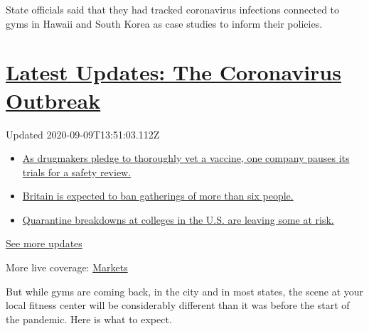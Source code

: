 State officials said that they had tracked coronavirus infections
connected to gyms in Hawaii and South Korea as case studies to inform
their policies.

\hypertarget{latest-updates-the-coronavirus-outbreak}{%
\section{\texorpdfstring{\href{https://www.nytimes3xbfgragh.onion/2020/09/09/world/covid-19-coronavirus.html?action=click\&pgtype=Article\&state=default\&region=MAIN_CONTENT_1\&context=storylines_live_updates}{Latest
Updates: The Coronavirus
Outbreak}}{Latest Updates: The Coronavirus Outbreak}}\label{latest-updates-the-coronavirus-outbreak}}

Updated 2020-09-09T13:51:03.112Z

\begin{itemize}
\tightlist
\item
  \href{https://www.nytimes3xbfgragh.onion/2020/09/09/world/covid-19-coronavirus.html?action=click\&pgtype=Article\&state=default\&region=MAIN_CONTENT_1\&context=storylines_live_updates\#link-70cea8bb}{As
  drugmakers pledge to thoroughly vet a vaccine, one company pauses its
  trials for a safety review.}
\item
  \href{https://www.nytimes3xbfgragh.onion/2020/09/09/world/covid-19-coronavirus.html?action=click\&pgtype=Article\&state=default\&region=MAIN_CONTENT_1\&context=storylines_live_updates\#link-780eaa2f}{Britain
  is expected to ban gatherings of more than six people.}
\item
  \href{https://www.nytimes3xbfgragh.onion/2020/09/09/world/covid-19-coronavirus.html?action=click\&pgtype=Article\&state=default\&region=MAIN_CONTENT_1\&context=storylines_live_updates\#link-11cec4c0}{Quarantine
  breakdowns at colleges in the U.S. are leaving some at risk.}
\end{itemize}

\href{https://www.nytimes3xbfgragh.onion/2020/09/09/world/covid-19-coronavirus.html?action=click\&pgtype=Article\&state=default\&region=MAIN_CONTENT_1\&context=storylines_live_updates}{See
more updates}

More live coverage:
\href{https://www.nytimes3xbfgragh.onion/live/2020/09/09/business/stock-market-today-coronavirus?action=click\&pgtype=Article\&state=default\&region=MAIN_CONTENT_1\&context=storylines_live_updates}{Markets}

But while gyms are coming back, in the city and in most states, the
scene at your local fitness center will be considerably different than
it was before the start of the pandemic. Here is what to expect.

